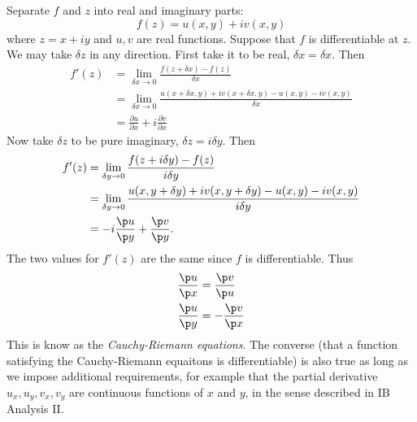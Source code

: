 \documentclass[a4paper]{article}
\begin{document}
Separate \(f\) and \(z\) into real and imaginary parts:
\[
  f(z) = u(x, y) + iv(x, y)
\]
where \(z = x + iy\) and \(u, v\) are real functions. Suppose that \(f\) is differentiable at \(z\). We may take \(\delta z\) in any direction. First take it to be real, \(\delta x = \delta x\). Then
\begin{align*}
  f'(z) &= \lim_{\delta x \to 0} \frac{f(z + \delta x) - f(z)}{\delta x} \\
        &= \lim_{\delta x \to 0} \frac{u(x + \delta x, y) + iv(x + \delta x, y) - u(x, y) - iv(x, y)}{\delta x} \\
        &= \frac{\partial u}{\partial x} + i \frac{\partial v}{\partial x}
\end{align*}
Now take \(\delta z\) to be pure imaginary, \(\delta z = i\delta y\). Then
\begin{align*}
  f'(z) &= \lim_{\delta y \to 0} \frac{f(z + i\delta y) - f(z)}{i\delta y} \\
        &= \lim_{\delta y \to 0} \frac{u(x, y + \delta y) + iv(x, y + \delta y) - u(x, y) - iv(x, y)}{i\delta y} \\
        &= -i\frac{\p u}{\p y} + \frac{\p v}{\p y}.
\end{align*}
The two values for \(f'(z)\) are the same since \(f\) is differentiable. Thus
\begin{align*}
  \frac{\p u}{\p x} &= \frac{\p v}{\p u} \\
  \frac{\p u}{\p y} &= -\frac{\p v}{\p x}
\end{align*}
This is know as the \emph{Cauchy-Riemann equations}. The converse (that a function satisfying the Cauchy-Riemann equaitons is differentiable) is also true as long as we impose additional requirements, for example that the partial derivative \(u_x, u_y, v_x, v_y\) are continuous functions of \(x\) and \(y\), in the sense described in IB Analysis II.
\end{document}
